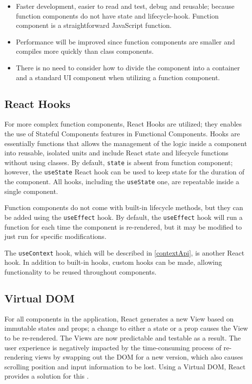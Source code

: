 \begin{itemize}
  \item Faster development, easier to read and test, debug and reusable; because function components do not have state and lifecycle-hook. Function component is a straightforward JavaScript function.
  \item Performance will be improved since function components are smaller and compiles more quickly than class components.
  \item There is no need to consider how to divide the component into a container and a standard UI component when utilizing a function component.
\end{itemize}

\subsection{React Hooks}
For more complex function components, React Hooks are utilized; they enables the use of Stateful Components features in Functional Components. Hooks are essentially functions that allows the management of the logic inside a component into reusable, isolated units and include React state and lifecycle functions without using classes. By default, \texttt{state} is absent from function component; however, the \texttt{useState} React hook can be used to keep state for the duration of the component. All hooks, including the \texttt{useState} one, are repeatable inside a single component.

Function components do not come with built-in lifecycle methods, but they can be added using the \texttt{useEffect} hook. By default, the \texttt{useEffect} hook will run a function for each time the component is re-rendered, but it may be modified to just run for specific modifications.

The \texttt{useContext} hook, which will be described in \autoref{contextApi}, is another React hook. In addition to built-in hooks, custom hooks can be made, allowing functionality to be reused throughout components.

\subsection{Virtual DOM}
For all components in the application, React generates a new View based on immutable states and props; a change to either a state or a prop causes the View to be re-rendered. The Views are now predictable and testable as a result. The user experience is negatively impacted by the time-consuming process of re-rendering views by swapping out the DOM for a new version, which also causes scrolling position and input information to be lost. Using a Virtual DOM, React provides a solution for this \autocite{david2020building}.

